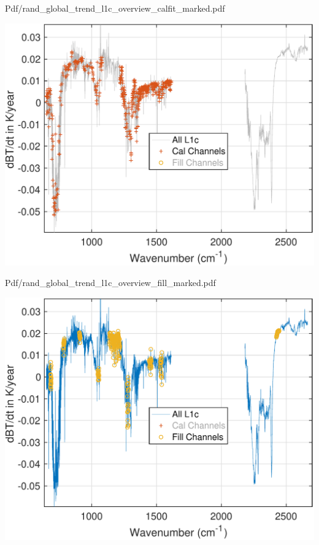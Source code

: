 \documentclass[presentation]{beamer}
\begin{document}
\begin{frame}[label={sec:org398be72}]{Pdf/rand\_global\_trend\_l1c\_overview\_calfit\_marked.pdf}
\begin{center}
\includegraphics[width=0.7\linewidth]{./Figs/Pdf/rand_global_trend_l1c_overview_calfit_marked.pdf}
\end{center}
\end{frame}

\begin{frame}[label={sec:org24b6a71}]{Pdf/rand\_global\_trend\_l1c\_overview\_fill\_marked.pdf}
\begin{center}
\includegraphics[width=0.7\linewidth]{./Figs/Pdf/rand_global_trend_l1c_overview_fill_marked.pdf}
\end{center}
\end{frame}
\end{document}
